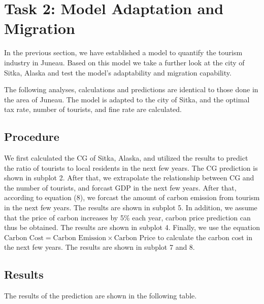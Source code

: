 \section{Task 2: Model Adaptation and Migration}

In the previous section, we have established a model to quantify 
the tourism industry in Juneau. 
Based on this model we take a further look at the city of Sitka, Alaska and
test the model's adaptability and migration capability.

The following analyses, calculations and predictions are identical to those done
in the area of Juneau. The model is adapted to the city of Sitka, and the optimal tax rate, number of tourists, and fine rate are calculated.

\subsection{Procedure}

We first calculated the CG of Sitka, Alaska, and utilized the results
to predict the ratio of tourists to local residents in the next few years.
The CG prediction is shown in subplot 2. After that, we extrapolate the relationship
between CG and the number of tourists, and forcast GDP in the next few years.
After that, according to equation (8), we forcast the amount of carbon emission
from tourism in the next few years. The results are shown in subplot 5. In addition, 
we assume that the price of carbon increases by 5\% each year, carbon price prediction 
can thus be obtained. The results are shown in subplot 4. Finally, we use the equation
$\text{Carbon Cost} = \text{Carbon Emission} \times \text{Carbon Price}$ to calculate the
carbon cost in the next few years. The results are shown in subplot 7 and 8.

\subsection{Results}

The results of the prediction are shown in the following table.


